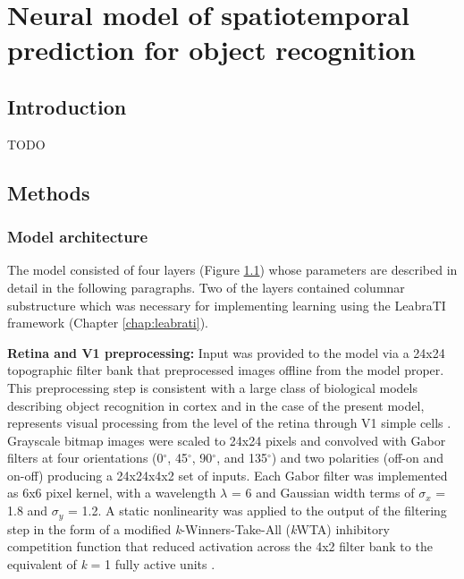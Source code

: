 \documentclass[dwyatte_dissertation.tex]{subfiles}
\begin{document}
\chapter{Neural model of spatiotemporal prediction for object recognition}

\section{Introduction}
TODO

\section{Methods}

\subsection{Model architecture}

The model consisted of four layers (Figure \ref{fig:v1_v2}) whose parameters are described in detail in the following paragraphs. Two of the layers contained columnar substructure which was necessary for implementing learning using the LeabraTI framework (Chapter \ref{chap:leabrati}).

\begin{figure}[h!]
\begin{center}
\end{center}
\caption{}{}
\label{fig:v1_v2}
\end{figure}

\textbf{Retina and V1 preprocessing:} Input was provided to the model via a 24x24 topographic filter bank that preprocessed images offline from the model proper. This preprocessing step is consistent with a large class of biological models describing object recognition in cortex \cite[e.g.,]{RiesenhuberPoggio99,SerreOlivaPoggio07,OReillyWyatteHerdEtAl13} and in the case of the present model, represents visual processing from the level of the retina through V1 simple cells \cite{HubelWiesel62}. Grayscale bitmap images were scaled to 24x24 pixels and convolved with Gabor filters at four orientations (0$^\circ$, 45$^\circ$, 90$^\circ$, and 135$^\circ$) and two polarities (off-on and on-off) producing a 24x24x4x2 set of inputs. Each Gabor filter was implemented as 6x6 pixel kernel, with a wavelength $\lambda$ = 6 and Gaussian width terms of $\sigma_x$ = 1.8 and $\sigma_y$ = 1.2. A static nonlinearity was applied to the output of the filtering step in the form of a modified \textit{k}-Winners-Take-All (\textit{k}WTA) inhibitory competition function that reduced activation across the 4x2 filter bank to the equivalent of \textit{k} = 1 fully active units \cite[see][Supporting Information]{OReillyWyatteHerdEtAl13}.
\end{document}
